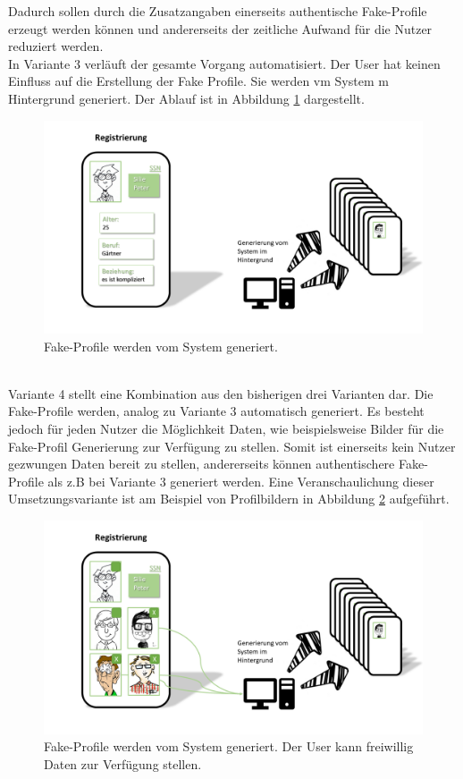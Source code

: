 \documentclass{sigchi}
\begin{document}
Dadurch sollen durch die Zusatzangaben einerseits authentische Fake-Profile erzeugt werden können und andererseits der zeitliche Aufwand für die Nutzer reduziert werden. \\
In Variante 3 verläuft der gesamte Vorgang automatisiert. Der User hat keinen Einfluss auf die Erstellung der Fake Profile. Sie werden vm System m Hintergrund generiert. Der Ablauf ist in Abbildung \ref{fig:Umsetzung3} dargestellt.
\begin{figure}[htbp]
	\includegraphics[width=0.8\columnwidth]{figures/Umsetzung3.PNG}
	\caption{Fake-Profile werden vom System generiert.}
	\label{fig:Umsetzung3}
\end{figure}
\\
Variante 4 stellt eine Kombination aus den bisherigen drei Varianten dar. Die Fake-Profile werden, analog zu Variante 3 automatisch generiert. Es besteht jedoch für jeden Nutzer die Möglichkeit Daten, wie beispielsweise Bilder für die Fake-Profil Generierung zur Verfügung zu stellen. Somit ist einerseits kein Nutzer gezwungen Daten bereit zu stellen, andererseits können authentischere Fake-Profile als z.B bei Variante 3 generiert werden. Eine Veranschaulichung dieser Umsetzungsvariante ist am Beispiel von Profilbildern in Abbildung \ref{fig:Umsetzung4} aufgeführt. 
\begin{figure}[htbp]
	\includegraphics[width=\columnwidth]{figures/Umsetzung4.PNG}
	\caption{Fake-Profile werden vom System generiert. Der User kann freiwillig Daten zur Verfügung stellen.}
	\label{fig:Umsetzung4}
\end{figure}
\end{document}
